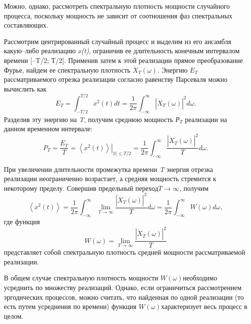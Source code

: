 Можно, однако, рассмотреть спектральную плотность мощности случайного процесса, поскольку мощность не зависит от соотношения фаз спектральных составляющих.

Рассмотрим центрированный случайный процесс и выделим из его ансамбля какую--либо реализацию \textit{x(t)}, ограничив ее длительность конечным интервалом времени [--T/2; Т/2]. Применив затем к этой реализации прямое преобразование Фурье, найдем ее спектральную плотность $\dot{X}_{T} (\omega )$. Энергию $E_{T} $ рассматриваемого отрезка реализации согласно равенству Парсеваля можно вычислить как
\begin{equation} \label{GrindEQ__1_5_2_}
E_{T} =\int _{-T/2}^{T/2}x^{2} (t)dt =\frac{1}{2\pi } \int _{-\infty }^{\infty }\left|\dot{X}_{T} (\omega )\right|^{2} d\omega .
\end{equation}
Разделив эту энергию на \textit{T}, получим среднюю мощность \textit{Р${}_{T}$} реализации на данном временном интервале:
\begin{equation} \label{GrindEQ__1_5_3_}
P_{T} =\frac{E_{T} }{T} =\left. \left\langle x^{2} (t)\right\rangle \right|_{\left|t\right|\le T/2} =\frac{1}{2\pi } \int _{-\infty }^{\infty }\frac{\left|\dot{X}_{T} (\omega )\right|^{2} }{T} d\omega .
\end{equation}

При увеличении длительности промежутка времени \textit{T} энергия отрезка реализации неограниченно возрастает, а средняя мощность стремится к некоторому пределу. Совершив предельный переход$T\to \infty $, получим
\begin{equation} \label{GrindEQ__1_5_4_}
\left\langle x^{2} (t)\right\rangle =\frac{1}{2\pi } \int _{-\infty }^{\infty }\mathop{\lim }\limits_{T\to \infty } \frac{\left|\dot{X}_{T} (\omega )\right|^{2} }{T} d\omega =\frac{1}{2\pi } \int _{-\infty }^{\infty }W(\omega )d\omega  ,
\end{equation}
где функция
\begin{equation} \label{GrindEQ__1_5_5_}
W(\omega )=\mathop{\lim }\limits_{T\to \infty } \frac{\left|\dot{X}_{T} (\omega )\right|^{2} }{T}
\end{equation}
представляет собой спектральную плотность средней мощности рассматриваемой реализации.

В общем случае спектральную плотность мощности $W(\omega )$необходимо усреднить по множеству реализаций. Однако, если ограничиться рассмотрением эргодических процессов, можно считать, что найденная по одной реализации (то есть путем усреднения по времени) функция $W(\omega )$характеризует весь процесс в целом.


